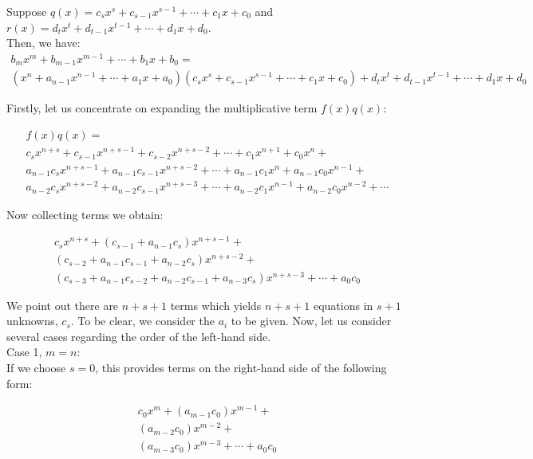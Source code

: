 Suppose $q(x)=c_{s}x^{s}+c_{s-1}x^{s-1}+ \cdots + c_{1}x+c_{0}$ and $r(x)=d_{t}x^{t}+d_{t-1}x^{t-1}+ \cdots + d_{1}x+d_{0}$.\\

Then, we have:
\begin{multline}
b_{m}x^{m}+b_{m-1}x^{m-1}+ \cdots + b_{1} x + b_{0} = \\
(x^{n}+a_{n-1}x^{n-1}+\cdots+a_{1}x+a_{0})(c_{s}x^{s}+c_{s-1}x^{s-1}+ \cdots + c_{1}x+c_{0})+d_{t}x^{t}+d_{t-1}x^{t-1}+ \cdots + d_{1}x+d_{0}
\end{multline}

Firstly, let us concentrate on expanding the multiplicative term $f(x)q(x)$:

\begin{multline}
f(x)q(x)= \\ 
c_{s}x^{n+s}+c_{s-1}x^{n+s-1}+c_{s-2}x^{n+s-2}+\cdots+c_{1}x^{n+1}+c_{0}x^{n} + \\
a_{n-1}c_{s}x^{n+s-1} + a_{n-1}c_{s-1}x^{n+s-2} + \cdots + a_{n-1}c_{1}x^{n}+a_{n-1}c_{0}x^{n-1} + \\
a_{n-2}c_{s}x^{n+s-2} + a_{n-2}c_{s-1}x^{n+s-3} + \cdots + a_{n-2}c_{1}x^{n-1}+a_{n-2}c_{0}x^{n-2} + \cdots 
\end{multline}

Now collecting terms we obtain:

\begin{multline}
c_{s}x^{n+s}+ (c_{s-1}+a_{n-1}c_{s} ) x^{n+s-1} + \\ (c_{s-2}+a_{n-1}c_{s-1}+a_{n-2}c_{s} ) x^{n+s-2} +\\ (c_{s-3}+a_{n-1}c_{s-2}+a_{n-2}c_{s-1}+ a_{n-3}c_{s} ) x^{n+s-3} + \cdots + a_{0}c_{0}
\end{multline}

We point out there are $n+s+1$ terms which yields $n+s+1$ equations in $s+1$ unknowns, $c_{s}$.  To be clear, we consider the $a_{i}$ to be given.  Now, let us consider several cases regarding the order of the left-hand side.\\

Case 1,  $m=n$:\\

If we choose $s=0$, this provides terms on the right-hand side of the following form:

\begin{multline}
c_{0}x^{m}+ (a_{m-1}c_{0} ) x^{m-1} + \\ (a_{m-2}c_{0} ) x^{m-2} +\\ (a_{m-3}c_{0} ) x^{m-3} + \cdots + a_{0}c_{0}
\end{multline}


